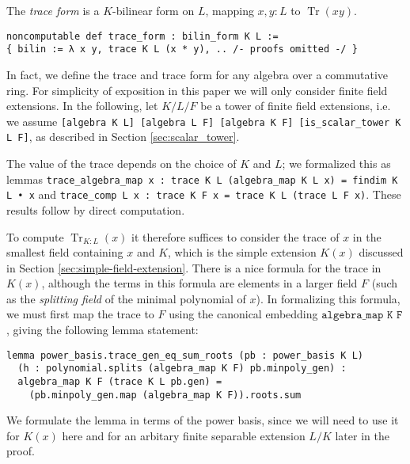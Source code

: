 \documentclass[a4paper,USenglish,cleveref, autoref, thm-restate]{lipics-v2021}
\newcommand{\lean}[1]{\texttt{#1}\xspace} %
\DeclareMathOperator{\Tr}{\mathrm{Tr}}
\begin{document}
The \emph{trace form} is a $K$-bilinear form on $L$, mapping $x, y : L$ to $\Tr(xy)$.
\begin{lstlisting}
noncomputable def trace_form : bilin_form K L :=
{ bilin := λ x y, trace K L (x * y), .. /- proofs omitted -/ }
\end{lstlisting}

In fact, we define the trace and trace form for any algebra over a commutative ring.
For simplicity of exposition in this paper we will only consider finite field extensions. %
In the following, let $K / L / F$ be a tower of finite field extensions,
i.e. we assume \lean{[algebra K L] [algebra L F] [algebra K F] [is\_scalar\_tower K L F]}, as described in Section \ref{sec:scalar_tower}.

The value of the trace depends on the choice of $K$ and $L$;
we formalized this as lemmas \lean{trace\_algebra\_map x : trace K L (algebra\_map K L x) = findim K L • x}
and \lean{trace\_comp L x : trace K F x = trace K L (trace L F x)}.
These results follow by direct computation.

To compute $\Tr_{K : L}(x)$ it therefore suffices to consider the trace of $x$ in the smallest field containing $x$ and $K$, which is the simple extension $K(x)$ discussed in Section \ref{sec:simple-field-extension}.
There is a nice formula for the trace in $K(x)$, although the terms in this formula are elements in a larger field $F$
(such as the \emph{splitting field} of the minimal polynomial of $x$).
In formalizing this formula, we must first map the trace to $F$ using the canonical embedding $\lean{algebra\_map K F}$,
giving the following lemma statement:
\begin{lstlisting}
lemma power_basis.trace_gen_eq_sum_roots (pb : power_basis K L)
  (h : polynomial.splits (algebra_map K F) pb.minpoly_gen) :
  algebra_map K F (trace K L pb.gen) =
    (pb.minpoly_gen.map (algebra_map K F)).roots.sum
\end{lstlisting}
We formulate the lemma in terms of the power basis, since we will need to use it for $K(x)$ here
and for an arbitary finite separable extension $L / K$ later in the proof.
\end{document}
